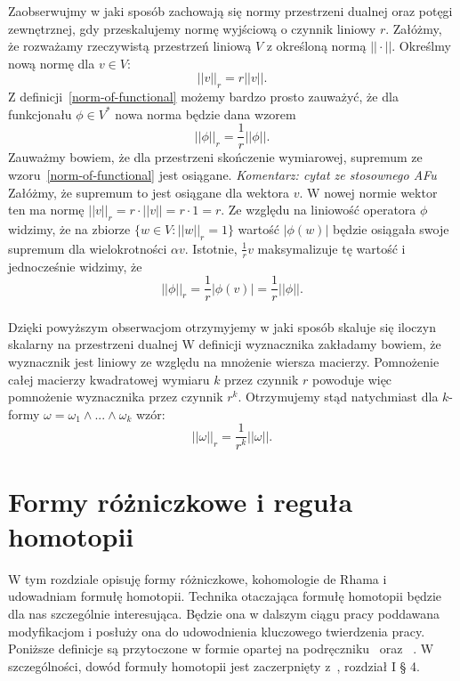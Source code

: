 \documentclass[licencjacka]{pracamgr}
\theoremstyle{definition}
\theoremstyle{definition}
\theoremstyle{plain}
\theoremstyle{plain}
\theoremstyle{plain}
\theoremstyle{plain}
\begin{document}
Zaobserwujmy w jaki sposób zachowają się normy przestrzeni dualnej oraz potęgi
zewnętrznej, gdy przeskalujemy normę wyjściową
o czynnik liniowy $r$.
Załóżmy, że rozważamy rzeczywistą przestrzeń liniową $V$ z określoną
normą $|| \cdot ||$. Określmy nową normę dla $v \in V$:
\[
|| v ||_r = r || v ||.
\]
Z definicji~\ref{norm-of-functional} możemy bardzo prosto zauważyć, że
dla funkcjonału $\phi \in V^\ast$ nowa norma będzie dana 
wzorem
\[
|| \phi ||_r = \frac{1}{r} ||\phi ||.
\]
Zauważmy bowiem, że dla przestrzeni skończenie wymiarowej, supremum
ze wzoru~\ref{norm-of-functional} jest osiągane. 
\emph{Komentarz: cytat ze stosownego AFu}
Załóżmy, że supremum to jest osiągane dla wektora $v$. W nowej normie wektor
ten ma normę $|| v ||_r = r \cdot || v || = r \cdot 1 = r$. Ze względu
na liniowość operatora $\phi$ widzimy, że na zbiorze $\{w \in V: ||w||_r = 1\}$
wartość $| \phi (w) |$ będzie osiągała swoje supremum dla wielokrotności
$\alpha v$. Istotnie, $\frac{1}{r} v$ maksymalizuje tę wartość i 
jednocześnie widzimy, że 
\[
||\phi||_r = \frac{1}{r} |\phi(v)| = \frac{1}{r}|| \phi ||.
\]  \\

Dzięki powyższym obserwacjom otrzymyjemy w jaki sposób skaluje się iloczyn
skalarny na przestrzeni dualnej W definicji wyznacznika zakładamy bowiem, że
wyznacznik jest liniowy ze względu na mnożenie wiersza macierzy. Pomnożenie
całej macierzy kwadratowej wymiaru $k$ przez czynnik $r$ powoduje więc pomnożenie
wyznacznika przez czynnik $r^k$.  Otrzymujemy stąd natychmiast dla $k$-formy
$\omega = \omega_1 \wedge ... \wedge
\omega_k$  wzór:
\begin{equation}\label{scaling-of-norm}
|| \omega ||_r = \frac{1}{r^k} || \omega ||.
\end{equation}


\chapter{Formy różniczkowe i reguła homotopii}\label{chapter-ordinary-cohomology}
W tym rozdziale opisuję formy różniczkowe, kohomologie de Rhama i
udowadniam formułę homotopii.
Technika otaczająca formułę homotopii
będzie dla nas szczególnie interesująca. Będzie ona w dalszym
ciągu pracy poddawana modyfikacjom i posłuży ona 
do udowodnienia kluczowego twierdzenia pracy. 
Poniższe definicje są przytoczone w formie opartej na podręczniku~\cite{lee}
oraz ~\cite{bott}. W szczególności, dowód formuły homotopii jest zaczerpnięty
z~\cite{bott}, rozdział I § 4. \\
\end{document}
